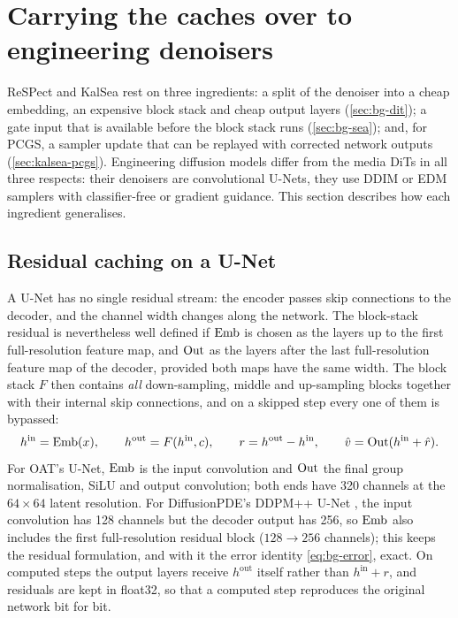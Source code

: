 \section{Carrying the caches over to engineering denoisers}\label{sec:app-general}

ReSPect and KalSea rest on three ingredients: a split of the denoiser into a cheap embedding, an expensive block stack and cheap output layers (\cref{sec:bg-dit}); a gate input that is available before the block stack runs (\cref{sec:bg-sea}); and, for PCGS, a sampler update that can be replayed with corrected network outputs (\cref{sec:kalsea-pcgs}). Engineering diffusion models differ from the media DiTs in all three respects: their denoisers are convolutional U-Nets, they use DDIM or EDM samplers with classifier-free or gradient guidance. This section describes how each ingredient generalises.

\subsection{Residual caching on a U-Net}
A U-Net has no single residual stream: the encoder passes skip connections to the decoder, and the channel width changes along the network. The block-stack residual is nevertheless well defined if $\mathrm{Emb}$ is chosen as the layers up to the first full-resolution feature map, and $\mathrm{Out}$ as the layers after the last full-resolution feature map of the decoder, provided both maps have the same width. The block stack $F$ then contains \emph{all} down-sampling, middle and up-sampling blocks together with their internal skip connections, and on a skipped step every one of them is bypassed:
\begin{equation}
  h^{\mathrm{in}} = \mathrm{Emb}(x), \qquad h^{\mathrm{out}} = F(h^{\mathrm{in}}, c), \qquad r = h^{\mathrm{out}}-h^{\mathrm{in}}, \qquad \hat v = \mathrm{Out}(h^{\mathrm{in}}+\hat r) .
\end{equation}
For OAT's U-Net, $\mathrm{Emb}$ is the input convolution and $\mathrm{Out}$ the final group normalisation, SiLU and output convolution; both ends have 320 channels at the $64\times64$ latent resolution. For DiffusionPDE's DDPM++ U-Net \citep{karras2022edm}, the input convolution has 128 channels but the decoder output has 256, so $\mathrm{Emb}$ also includes the first full-resolution residual block ($128\to256$ channels); this keeps the residual formulation, and with it the error identity \cref{eq:bg-error}, exact. On computed steps the output layers receive $h^{\mathrm{out}}$ itself rather than $h^{\mathrm{in}}+r$, and residuals are kept in float32, so that a computed step reproduces the original network bit for bit.

